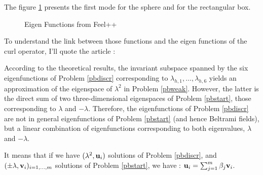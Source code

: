 The figure \ref{feelModes} presents the first mode for the sphere and for the rectangular box.
\begin{figure}[H]
  \caption{Eigen Functions from Feel++}
  \label{feelModes}
\end{figure}

To understand the link between those functions and the eigen functions of the curl operator, I'll quote the article \cite{Venegas2013} :
\begin{italicquotes}
  According to the theoretical results, the invariant subspace spanned by the six eigenfunctions of Problem \ref{pbdiscr} corresponding to $\lambda_{h,1},\dots,\lambda_{h,6}$ yields an approximation of the eigenspace of $\lambda^2$ in Problem \ref{pbweak}. However, the latter is the direct sum of two three-dimensional eigenspaces of Problem \ref{pbstart}, those corresponding to $\lambda$ and $-\lambda$. Therefore, the eigenfunctions of Problem \ref{pbdiscr} are not in general eigenfunctions of Problem \ref{pbstart} (and hence Beltrami fields), but a linear combination of eigenfunctions corresponding to both eigenvalues, $\lambda$ and $-\lambda$.
\end{italicquotes}
It means that if we have $(\lambda^2,{\mathbf{u}}_i)$ solutions of Problem \ref{pbdiscr}, and $(\pm\lambda,{\mathbf{v}}_i)_{i=1,\dots,m}$ solutions of Problem \ref{pbstart}, we have : ${\mathbf{u}}_i=\sum_{j=1}^m \beta_j{\mathbf{v}}_i$.\\

